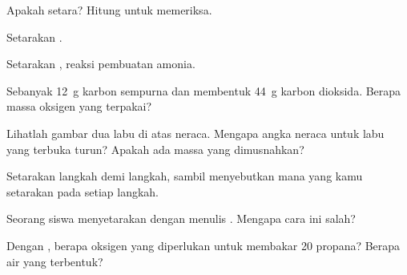 \begin{exercise}[$\star$]\label{exo:g8:balanced-equations:3}
Apakah  setara? Hitung  untuk memeriksa.
\end{exercise}

\begin{exercise}[$\star$]\label{exo:g8:balanced-equations:4}
Setarakan . %
\end{exercise}

\begin{exercise}[$\star\star$]\label{exo:g8:balanced-equations:5}
Setarakan , reaksi pembuatan amonia. %
\end{exercise}

\begin{exercise}[$\star\star$]\label{exo:g8:balanced-equations:6}
Sebanyak \qty{12}{g} karbon  sempurna dan membentuk
\qty{44}{g} karbon dioksida. Berapa massa oksigen yang terpakai?
\end{exercise}

\begin{exercise}[$\star\star$]\label{exo:g8:balanced-equations:7}
Lihatlah gambar dua labu di atas neraca. Mengapa angka neraca untuk labu
yang terbuka turun? Apakah ada massa yang dimusnahkan?
\end{exercise}

\begin{exercise}[$\star\star$]\label{exo:g8:balanced-equations:8}
Setarakan  langkah demi langkah, sambil %
menyebutkan  mana yang kamu setarakan pada setiap langkah.
\end{exercise}

\begin{exercise}[$\star\star$]\label{exo:g8:balanced-equations:9}
Seorang siswa menyetarakan  dengan menulis . %
Mengapa cara ini salah?
\end{exercise}

\begin{exercise}[$\star\star$]\label{exo:g8:balanced-equations:10}
Dengan , berapa  oksigen yang
diperlukan untuk membakar 20  propana? Berapa  air yang
terbentuk?
\end{exercise}

